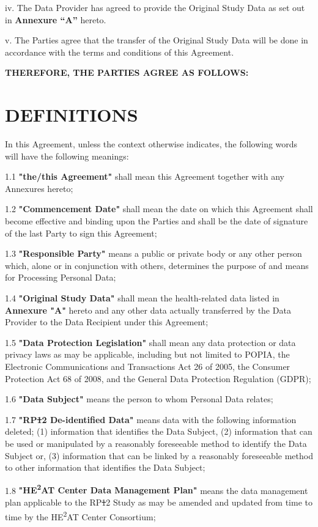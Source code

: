 \documentclass[12pt,letterpaper]{article}
\newcommand{\deleted}[1]{\textcolor{deletecolor}{\sout{#1}}}
\newcommand{\added}[1]{\textcolor{addcolor}{#1}}
\begin{document}
iv. The Data Provider has agreed to provide the Original Study Data as set out in \textbf{Annexure ``A''} hereto.

v. The Parties agree that the transfer of the Original Study Data will be done in accordance with the terms and conditions of this Agreement.

\textbf{THEREFORE, THE PARTIES AGREE AS FOLLOWS:}

\section{DEFINITIONS}

In this Agreement, unless the context otherwise indicates, the following words will have the following meanings:

1.1 \textbf{"the/this Agreement"} shall mean this Agreement together with any Annexures hereto;

1.2 \textbf{"Commencement Date"} shall mean the date on which this Agreement shall become effective and binding upon the Parties and shall be the date of signature of the last Party to sign this Agreement;

1.3 \textbf{"Responsible Party"} means a public or private body or any other person which, alone or in conjunction with others, determines the purpose of and means for Processing Personal Data;

1.4 \textbf{"Original Study Data"} shall mean the health-related data listed in \textbf{Annexure "A"} hereto and any other data actually transferred by the Data Provider to the Data Recipient under this Agreement;

1.5 \textbf{"Data Protection Legislation"} shall mean any data protection or data privacy laws as may be applicable, including but not limited to POPIA, the Electronic Communications and Transactions Act 26 of 2005, the Consumer Protection Act 68 of 2008, and the General Data Protection Regulation (GDPR);

1.6 \textbf{"Data Subject"} means the person to whom Personal Data relates;

1.7 \textbf{"RP\deleted{1}\added{2} De-identified Data"} means data with the following information deleted; (1) information that identifies the Data Subject, (2) information that can be used or manipulated by a reasonably foreseeable method to identify the Data Subject or, (3) information that can be linked by a reasonably foreseeable method to other information that identifies the Data Subject;

1.8 \textbf{"HE\textsuperscript{2}AT Center Data Management Plan"} means the data management plan applicable to the RP\deleted{1}\added{2} Study as may be amended and updated from time to time by the HE\textsuperscript{2}AT Center Consortium;
\end{document}

